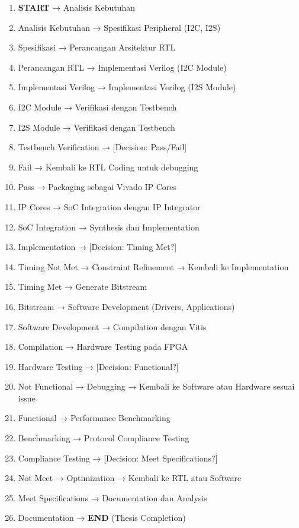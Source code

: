 \begin{enumerate}
	\item \textbf{START} → Analisis Kebutuhan
	\item Analisis Kebutuhan → Spesifikasi Peripheral (I2C, I2S)
	\item Spesifikasi → Perancangan Arsitektur RTL
	\item Perancangan RTL → Implementasi Verilog (I2C Module)
	\item Implementasi Verilog → Implementasi Verilog (I2S Module)
	\item I2C Module → Verifikasi dengan Testbench
	\item I2S Module → Verifikasi dengan Testbench
	\item Testbench Verification → [Decision: Pass/Fail]
	\item Fail → Kembali ke RTL Coding untuk debugging
	\item Pass → Packaging sebagai Vivado IP Cores
	\item IP Cores → SoC Integration dengan IP Integrator
	\item SoC Integration → Synthesis dan Implementation
	\item Implementation → [Decision: Timing Met?]
	\item Timing Not Met → Constraint Refinement → Kembali ke Implementation
	\item Timing Met → Generate Bitstream
	\item Bitstream → Software Development (Drivers, Applications)
	\item Software Development → Compilation dengan Vitis
	\item Compilation → Hardware Testing pada FPGA
	\item Hardware Testing → [Decision: Functional?]
	\item Not Functional → Debugging → Kembali ke Software atau Hardware sesuai issue
	\item Functional → Performance Benchmarking
	\item Benchmarking → Protocol Compliance Testing
	\item Compliance Testing → [Decision: Meet Specifications?]
	\item Not Meet → Optimization → Kembali ke RTL atau Software
	\item Meet Specifications → Documentation dan Analysis
	\item Documentation → \textbf{END} (Thesis Completion)
\end{enumerate}

